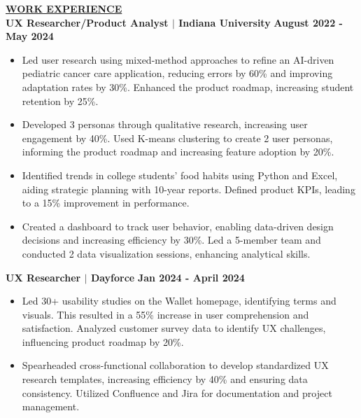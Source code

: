 \documentclass{article}
\begin{document}
\noindent \textbf{\underline{WORK EXPERIENCE}} \\
\noindent \textbf{UX Researcher/Product Analyst $\mid$ Indiana University } \hfill \textbf{August 2022 - May 2024}
\begin{itemize}[noitemsep,nolistsep,leftmargin=*]
      \item Led user research using mixed-method approaches to refine an AI-driven pediatric cancer care application, reducing errors by 60\% and improving adaptation rates by 30\%. Enhanced the product roadmap, increasing student retention by 25\%.
    \item Developed 3 personas through qualitative research, increasing user engagement by 40\%. Used K-means clustering to create 2 user personas, informing the product roadmap and increasing feature adoption by 20\%.
    \item Identified trends in college students' food habits using Python and Excel, aiding strategic planning with 10-year reports. Defined product KPIs, leading to a 15\% improvement in performance.
    \item Created a dashboard to track user behavior, enabling data-driven design decisions and increasing efficiency by 30\%. Led a 5-member team and conducted 2 data visualization sessions, enhancing analytical skills.
\end{itemize}

\vspace{1mm}

\noindent \textbf{UX Researcher $\mid$ Dayforce} 
\hfill \textbf{Jan 2024 - April 2024}
\begin{itemize}[noitemsep,nolistsep,leftmargin=*]
    \item Led 30+ usability studies on the Wallet homepage, identifying terms and visuals. This resulted in a 55\% increase in user comprehension and satisfaction. Analyzed customer survey data to identify UX challenges, influencing product roadmap by 20\%.
    \item Spearheaded cross-functional collaboration to develop standardized UX research templates, increasing efficiency by 40\% and ensuring data consistency. Utilized Confluence and Jira for documentation and project management.
\end{itemize}


\vspace{1mm}
\end{document}
